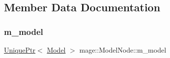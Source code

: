 \subsection{Member Data Documentation}
\hypertarget{classmage_1_1_model_node_a784faf19f736a1c74808321ed0e52d36}{}\label{classmage_1_1_model_node_a784faf19f736a1c74808321ed0e52d36} 
\subsubsection{\texorpdfstring{m\+\_\+model}{m\_model}}
{\footnotesize\ttfamily \hyperlink{namespacemage_a8c307fbcc33bce9b7f2aa4c26c3b95cf}{Unique\+Ptr}$<$ \hyperlink{classmage_1_1_model}{Model} $>$ mage\+::\+Model\+Node\+::m\+\_\+model\hspace{0.3cm}{\ttfamily [private]}}

